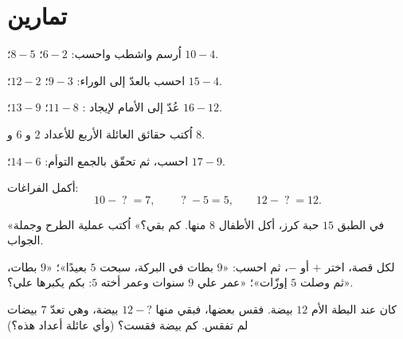 \section{تمارين}

\begin{exercise}[$\star$]\label{exo:g1:subtraction:1}
اُرسم واشطب واحسب: $6 - 2$؛ \quad $8 - 5$؛ \quad
$10 - 4$.
\end{exercise}

\begin{exercise}[$\star$]\label{exo:g1:subtraction:2}
احسب بالعدّ إلى الوراء: $9 - 3$؛ \quad $12 - 2$؛ \quad
$15 - 4$.
\end{exercise}

\begin{exercise}[$\star$]\label{exo:g1:subtraction:3}
عُدّ إلى الأمام لإيجاد : $11 - 8$؛ \quad $13 - 9$؛ \quad
$16 - 12$.
\end{exercise}

\begin{exercise}[$\star$]\label{exo:g1:subtraction:4}
اُكتب حقائق العائلة الأربع للأعداد $2$ و $6$ و $8$.
\end{exercise}

\begin{exercise}[$\star$]\label{exo:g1:subtraction:5}
احسب، ثم تحقّق بالجمع التوأم: $14 - 6$؛ \quad
$17 - 9$.
\end{exercise}

\begin{exercise}[$\star$]\label{exo:g1:subtraction:6}
أكمل الفراغات:
\[
10 - \;?\; = 7, \qquad
\;?\; - 5 = 5, \qquad
12 - \;?\; = 12 .
\]
\end{exercise}

\begin{exercise}[$\star$]\label{exo:g1:subtraction:7}
«في الطبق $15$ حبة كرز، أكل الأطفال $8$ منها. كم بقي؟» اُكتب
عملية الطرح وجملة الجواب.
\end{exercise}

\begin{exercise}[$\star$]\label{exo:g1:subtraction:8}
لكل قصة، اختر $+$ أو $-$، ثم احسب: «$9$ بطات في البركة، سبحت
$5$ بعيدًا»؛ «$9$ بطات، ثم وصلت $5$ إوزّات»؛
«عمر علي $9$ سنوات وعمر أخته $5$: بكم يكبرها علي؟».
\end{exercise}

\begin{exercise}[$\star\star$]\label{exo:g1:subtraction:9}
كان عند البطة الأم $12$ بيضة. فقس بعضها، فبقي منها $12 - ?$ بيضة،
وهي تعدّ $7$ بيضات لم تفقس. كم بيضة فقست؟ (وأي عائلة أعداد
هذه؟)
\end{exercise}
